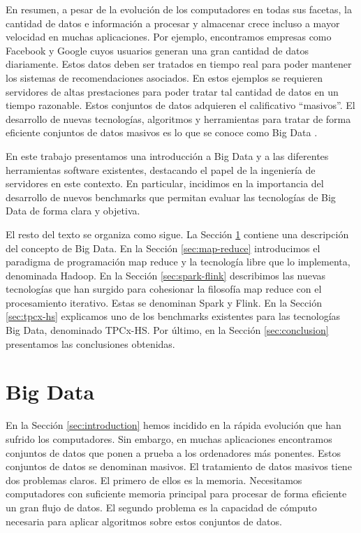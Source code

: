 \documentclass[10pt]{article}
\begin{document}
	En resumen, a pesar de la evolución de los computadores en todas sus facetas, la cantidad de datos e información a procesar y almacenar crece incluso a mayor velocidad en muchas aplicaciones. Por ejemplo, encontramos empresas como Facebook y Google cuyos usuarios generan una gran cantidad de datos diariamente. Estos datos deben ser tratados en tiempo real para poder mantener los sistemas de recomendaciones asociados. En estos ejemplos se requieren servidores de altas prestaciones para poder tratar tal cantidad de datos en un tiempo razonable. Estos conjuntos de datos adquieren el calificativo ``masivos''. El desarrollo de nuevas tecnologías, algoritmos y herramientas para tratar de forma eficiente conjuntos de datos masivos es lo que se conoce como Big Data \cite{big-data-herrera}.
	
	En este trabajo presentamos una introducción a Big Data y a las diferentes herramientas software existentes, destacando el papel de la ingeniería de servidores en este contexto. En particular, incidimos en la importancia del desarrollo de nuevos benchmarks que permitan evaluar las tecnologías de Big Data de forma clara y objetiva.

	El resto del texto se organiza como sigue. La Sección \ref{sec:big-data} contiene una descripción del concepto de Big Data. En la Sección \ref{sec:map-reduce} introducimos el paradigma de programación map reduce y la tecnología libre que lo implementa, denominada Hadoop. En la Sección \ref{sec:spark-flink} describimos las nuevas tecnologías que han surgido para cohesionar la filosofía map reduce con el procesamiento iterativo. Estas se denominan Spark y Flink. En la Sección \ref{sec:tpcx-hs} explicamos uno de los benchmarks existentes para las tecnologías Big Data, denominado TPCx-HS. Por último, en la Sección \ref{sec:conclusion} presentamos las conclusiones obtenidas.

\section{Big Data} \label{sec:big-data}
	
	En la Sección \ref{sec:introduction} hemos incidido en la rápida evolución que han sufrido los computadores. Sin embargo, en muchas aplicaciones encontramos conjuntos de datos que ponen a prueba a los ordenadores más ponentes. Estos conjuntos de datos se denominan masivos. El tratamiento de datos masivos tiene dos problemas claros. El primero de ellos es la memoria. Necesitamos computadores con suficiente memoria principal para procesar de forma eficiente un gran flujo de datos. El segundo problema es la capacidad de cómputo necesaria para aplicar algoritmos sobre estos conjuntos de datos. 
	
\end{document}
